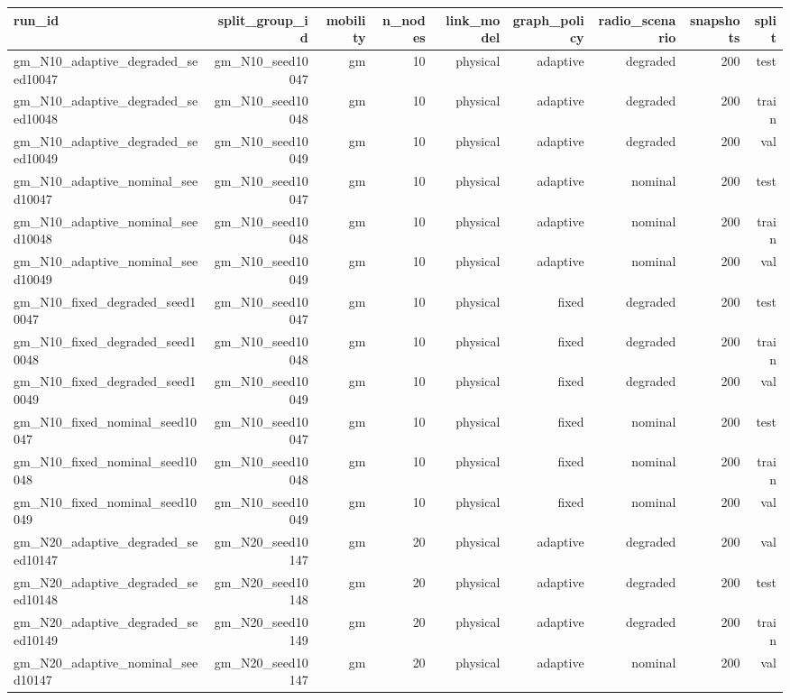 \begin{tabular}{lrrrrrrrr}
\toprule
run\_id & split\_group\_id & mobility & n\_nodes & link\_model & graph\_policy & radio\_scenario & snapshots & split \\
\midrule
gm\_N10\_adaptive\_degraded\_seed10047 & gm\_N10\_seed10047 & gm & 10 & physical & adaptive & degraded & 200 & test \\
gm\_N10\_adaptive\_degraded\_seed10048 & gm\_N10\_seed10048 & gm & 10 & physical & adaptive & degraded & 200 & train \\
gm\_N10\_adaptive\_degraded\_seed10049 & gm\_N10\_seed10049 & gm & 10 & physical & adaptive & degraded & 200 & val \\
gm\_N10\_adaptive\_nominal\_seed10047 & gm\_N10\_seed10047 & gm & 10 & physical & adaptive & nominal & 200 & test \\
gm\_N10\_adaptive\_nominal\_seed10048 & gm\_N10\_seed10048 & gm & 10 & physical & adaptive & nominal & 200 & train \\
gm\_N10\_adaptive\_nominal\_seed10049 & gm\_N10\_seed10049 & gm & 10 & physical & adaptive & nominal & 200 & val \\
gm\_N10\_fixed\_degraded\_seed10047 & gm\_N10\_seed10047 & gm & 10 & physical & fixed & degraded & 200 & test \\
gm\_N10\_fixed\_degraded\_seed10048 & gm\_N10\_seed10048 & gm & 10 & physical & fixed & degraded & 200 & train \\
gm\_N10\_fixed\_degraded\_seed10049 & gm\_N10\_seed10049 & gm & 10 & physical & fixed & degraded & 200 & val \\
gm\_N10\_fixed\_nominal\_seed10047 & gm\_N10\_seed10047 & gm & 10 & physical & fixed & nominal & 200 & test \\
gm\_N10\_fixed\_nominal\_seed10048 & gm\_N10\_seed10048 & gm & 10 & physical & fixed & nominal & 200 & train \\
gm\_N10\_fixed\_nominal\_seed10049 & gm\_N10\_seed10049 & gm & 10 & physical & fixed & nominal & 200 & val \\
gm\_N20\_adaptive\_degraded\_seed10147 & gm\_N20\_seed10147 & gm & 20 & physical & adaptive & degraded & 200 & val \\
gm\_N20\_adaptive\_degraded\_seed10148 & gm\_N20\_seed10148 & gm & 20 & physical & adaptive & degraded & 200 & test \\
gm\_N20\_adaptive\_degraded\_seed10149 & gm\_N20\_seed10149 & gm & 20 & physical & adaptive & degraded & 200 & train \\
gm\_N20\_adaptive\_nominal\_seed10147 & gm\_N20\_seed10147 & gm & 20 & physical & adaptive & nominal & 200 & val \\

\end{tabular}
